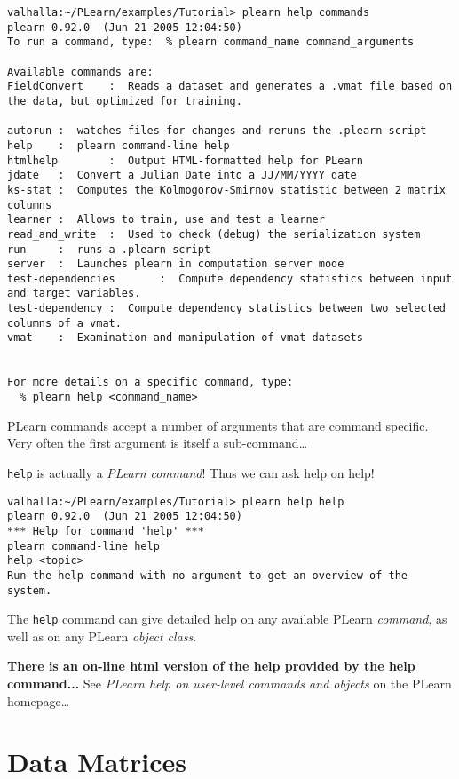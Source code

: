 \documentclass[11pt]{book}
\begin{document}
\begin{verbatim}
valhalla:~/PLearn/examples/Tutorial> plearn help commands
plearn 0.92.0  (Jun 21 2005 12:04:50)
To run a command, type:  % plearn command_name command_arguments

Available commands are:
FieldConvert    :  Reads a dataset and generates a .vmat file based on the data, but optimized for training.

autorun :  watches files for changes and reruns the .plearn script
help    :  plearn command-line help
htmlhelp        :  Output HTML-formatted help for PLearn
jdate   :  Convert a Julian Date into a JJ/MM/YYYY date
ks-stat :  Computes the Kolmogorov-Smirnov statistic between 2 matrix columns
learner :  Allows to train, use and test a learner
read_and_write  :  Used to check (debug) the serialization system
run     :  runs a .plearn script
server  :  Launches plearn in computation server mode
test-dependencies       :  Compute dependency statistics between input and target variables.
test-dependency :  Compute dependency statistics between two selected columns of a vmat.
vmat    :  Examination and manipulation of vmat datasets


For more details on a specific command, type:
  % plearn help <command_name>

\end{verbatim}

PLearn commands accept a number of arguments that are command specific.
Very often the first argument is itself a sub-command\ldots

{\tt help} is actually a {\em PLearn command}! Thus we can ask help on help!

\begin{verbatim}
valhalla:~/PLearn/examples/Tutorial> plearn help help
plearn 0.92.0  (Jun 21 2005 12:04:50)
*** Help for command 'help' ***
plearn command-line help
help <topic>
Run the help command with no argument to get an overview of the system.
\end{verbatim}

The {\tt help} command can give detailed help on any available PLearn {\em
  command}, as well as on any PLearn {\em object class}.

{\bf There is an on-line html version of the help provided by the help command...}
See {\em PLearn help on user-level commands and objects} on the PLearn homepage\ldots

\section{Data Matrices}
\end{document}
